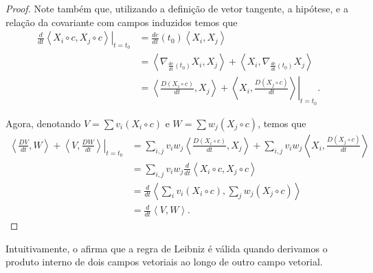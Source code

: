 \begin{corollary}
\begin{proof}
		Note também que, utilizando a definição de vetor tangente, a hipótese, e a relação da covariante com campos induzidos temos que
		\begin{align*}
			\left.\frac{d}{dt}\left<X_{i} \circ  c,X_{j} \circ  c\right>\right|_{t=t_{0}} & = \frac{dc}{dt}(t_{0})\left<X_{i},X_{j}\right>                                                                                \\
			                                                                              & = \left<\nabla_{\frac{dc}{dt}(t_{0})}X_{i},X_{j}\right> + \left<X_{i},\nabla_{\frac{dc}{dt}(t_{0})}X_{j}\right>               \\
			                                                                              & = \left.\left<\frac{D(X_{i} \circ  c)}{dt},X_{j}\right> + \left<X_{i},\frac{D(X_{j} \circ  c)}{dt}\right>  \right|_{t=t_{0}}.
		\end{align*}

		Agora, denotando $V=\sum v_{i}(X_{i}\circ c)$ e $W=\sum w_{j}(X_{j} \circ c)$, temos que
		\begin{align*}
			\left.\left<\frac{DV}{dt},W\right> +\left<V,\frac{DW}{dt}\right> \right|_{t=t_{0}} & = \sum_{i,j}v_{i}w_{j}\left<\frac{D(X_{i} \circ  c)}{dt},X_{j}\right> + \sum_{i,j}v_{i}w_{j}\left<X_{i},\frac{D(X_{j} \circ  c)}{dt}\right> \\
			                                                                                   & =\sum_{i,j}v_{i}w_{j}\frac{d}{dt}\left<X_{i} \circ  c,X_{j} \circ  c\right>                                                                 \\
			                                                                                   & =\frac{d}{dt}\left<\sum_{i}v_{i}(X_{i} \circ  c),\sum_{j}w_{j}(X_{j} \circ  c)\right>                                                       \\
			                                                                                   & =\frac{d}{dt}\left<V,W\right>.
		\end{align*}
	\end{proof}
\end{corollary}
Intuitivamente, o  afirma que a regra de Leibniz  é válida quando derivamos o produto interno de dois campos vetoriais ao longo de outro campo vetorial.

